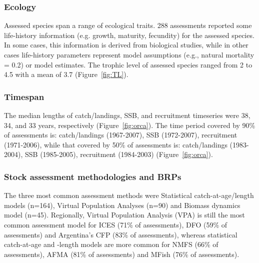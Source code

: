 \subsubsection*{Ecology}
Assessed species span a range of ecological traits.
288 assessments reported some life-history
information (e.g. growth, maturity, fecundity) for the assessed
species. In some cases, this information is derived from biological
studies, while in other cases life-history parameters represent model
assumptions (e.g., natural mortality = 0.2) or model estimates. The
trophic level of assessed species ranged from 2 to
4.5 with a mean of 3.7 (Figure~\ref{fig:TL}).




\subsubsection*{Timespan }


The median lengths of catch/landings, SSB, and recruitment timeseries
were 38, 34, and 33
years, respectively (Figure~\ref{fig:orca}).  The time period covered by 90\% of assessments
is: catch/landings (1967-2007), SSB
(1972-2007), recruitment (1971-2006), while that
covered by 50\% of assessments is: catch/landings
(1983-2004), SSB (1985-2005), recruitment
(1984-2003) (Figure~\ref{fig:orca}).

\subsubsection*{Stock assessment methodologies and BRPs}

The three most common assessment methods were
Statistical catch-at-age/length models (n=164), Virtual Population Analyses (n=90) and
Biomass dynamics model (n=45). Regionally, Virtual Population Analysis
(VPA) is still the most common assessment model for ICES
(71\% of assessments), DFO
(59\% of assessments) and Argentina's CFP
(83\% of assessments), whereas statistical
catch-at-age and -length models are more common for NMFS
(66\% of assessments), AFMA
(81\% of assessments) and MFish
(76\% of assessments).

